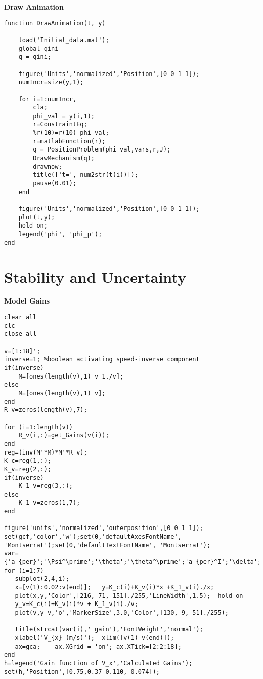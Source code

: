 \textbf{Draw Animation}
\begin{lstlisting}[style=codematlab]
function DrawAnimation(t, y)
    
    load('Initial_data.mat'); 
    global qini
    q = qini;   
                
    figure('Units','normalized','Position',[0 0 1 1]);
    numIncr=size(y,1);  
    
    for i=1:numIncr,
        cla;
        phi_val = y(i,1);
        r=ConstraintEq; 
        %r(10)=r(10)-phi_val;
        r=matlabFunction(r);
        q = PositionProblem(phi_val,vars,r,J);
        DrawMechanism(q);  
        drawnow;
        title(['t=', num2str(t(i))]);
        pause(0.01); 
    end
    
    figure('Units','normalized','Position',[0 0 1 1]);
    plot(t,y);
    hold on;
    legend('phi', 'phi_p');
end
\end{lstlisting}


\newpage
\section{Stability and Uncertainty}
\textbf{Model Gains}
\begin{lstlisting}[style=codematlab]
%% Controller with varying longitudinal velocity
clear all
clc
close all

v=[1:18]';
inverse=1; %boolean activating speed-inverse component
if(inverse)
    M=[ones(length(v),1) v 1./v];
else
    M=[ones(length(v),1) v];
end
R_v=zeros(length(v),7);

for (i=1:length(v))
    R_v(i,:)=get_Gains(v(i));
end
reg=(inv(M'*M)*M'*R_v);
K_c=reg(1,:);
K_v=reg(2,:);
if(inverse)
    K_1_v=reg(3,:);
else
    K_1_v=zeros(1,7);
end

figure('units','normalized','outerposition',[0 0 1 1]);
set(gcf,'color','w');set(0,'defaultAxesFontName', 'Montserrat');set(0,'defaultTextFontName', 'Montserrat');
var={'a_{per}';'\Psi^\prime';'\theta';'\theta^\prime';'a_{per}^I';'\delta';'\delta^\prime'};
for (i=1:7)
   subplot(2,4,i);
   x=[v(1):0.02:v(end)];   y=K_c(i)+K_v(i)*x +K_1_v(i)./x;
   plot(x,y,'Color',[216, 71, 151]./255,'LineWidth',1.5);  hold on
   y_v=K_c(i)+K_v(i)*v + K_1_v(i)./v;
   plot(v,y_v,'o','MarkerSize',3.0,'Color',[130, 9, 51]./255);
   
   title(strcat(var(i),' gain'),'FontWeight','normal');
   xlabel('V_{x} (m/s)');  xlim([v(1) v(end)]); 
   ax=gca;    ax.XGrid = 'on'; ax.XTick=[2:2:18];
end
h=legend('Gain function of V_x','Calculated Gains');
set(h,'Position',[0.75,0.37 0.110, 0.074]);
\end{lstlisting}

